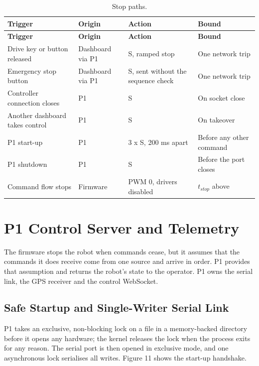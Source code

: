 \begin{center}
\begin{longtable}{|p{3.5cm}|p{2.5cm}|p{3cm}|p{3cm}|}
\caption{Stop paths.}
\label{tab:stop-paths} \\
\hline
\textbf{Trigger} & \textbf{Origin} & \textbf{Action} & \textbf{Bound} \\
\hline
\endfirsthead
\hline
\textbf{Trigger} & \textbf{Origin} & \textbf{Action} & \textbf{Bound} \\
\hline
\endhead
Drive key or button released & Dashboard via P1 & S, ramped stop & One network trip \\
\hline
Emergency stop button & Dashboard via P1 & S, sent without the sequence check & One network trip \\
\hline
Controller connection closes & P1 & S & On socket close \\
\hline
Another dashboard takes control & P1 & S & On takeover \\
\hline
P1 start-up & P1 & 3 x S, 200 ms apart & Before any other command \\
\hline
P1 shutdown & P1 & S & Before the port closes \\
\hline
Command flow stops & Firmware & PWM 0, drivers disabled & $t_{stop}$ above \\
\hline
\end{longtable}
\end{center}

\section{P1 Control Server and Telemetry}

The firmware stops the robot when commands cease, but it assumes that the commands it does receive come from one source and arrive in order. P1 provides that assumption and returns the robot's state to the operator. P1 owns the serial link, the GPS receiver and the control WebSocket.

\subsection{Safe Startup and Single-Writer Serial Link}

P1 takes an exclusive, non-blocking lock on a file in a memory-backed directory before it opens any hardware; the kernel releases the lock when the process exits for any reason. The serial port is then opened in exclusive mode, and one asynchronous lock serialises all writes. Figure 11 shows the start-up handshake.

